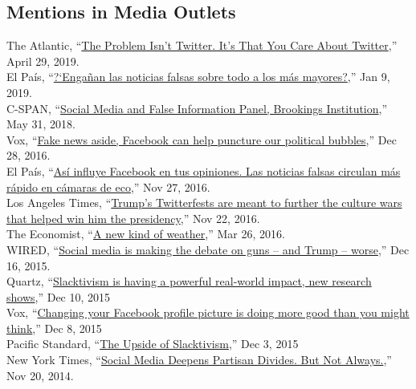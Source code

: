 \documentclass[margin,line,11pt]{resume}
\newcommand{\nl}{\vspace{0.10in}\\}
\begin{document}
\begin{resume}
                \section{\mysidestyle Mentions in Media Outlets}
The Atlantic, ``\href{https://www.theatlantic.com/ideas/archive/2019/04/political-leaders-should-stop-caring-about-twitter/588004/}{The Problem Isn't Twitter. It's That You Care About Twitter},'' April 29, 2019.\nl
El Pa\'{i}s, ``\href{https://elpais.com/tecnologia/2019/01/09/actualidad/1547029983_955487.html}{?`Enga\~{n}an las noticias falsas sobre todo a los m\'{a}s mayores?},'' Jan 9, 2019.\nl
C-SPAN, ``\href{https://www.c-span.org/video/?446330-3/social-media-false-information-panel-2}{Social Media and False Information Panel, Brookings Institution},'' May 31, 2018.\nl                
Vox, ``\href{http://www.vox.com/the-big-idea/2016/12/28/14095452/fake-news-political-bubbles-democracy-facebook}{Fake news aside, Facebook can help puncture our political bubbles},'' Dec 28, 2016.\nl
   \newpage
El Pa\'{i}s, ``\href{http://internacional.elpais.com/internacional/2016/11/25/actualidad/1480095728_565471.html}{As\'{i} influye Facebook en tus opiniones. Las noticias falsas circulan m\'{a}s r\'{a}pido en c\'{a}maras de eco},'' Nov 27, 2016.\nl
Los Angeles Times, ``\href{http://www.latimes.com/politics/la-na-pol-trump-twitter-20161122-story.html}{Trump's Twitterfests are meant to further the culture wars that helped win him the presidency},'' Nov 22, 2016.\nl 
The Economist, ``\href{http://www.economist.com/news/special-report/21695192-social-media-now-play-key-role-collective-action-new-kind-weather}{A new kind of weather},'' Mar 26, 2016.\nl
WIRED, ``\href{http://www.wired.com/2015/12/social-media-is-making-the-debate-on-guns-and-trump-worse/}{Social media is making the debate on guns -- and Trump -- worse},'' Dec 16, 2015.\nl
Quartz, ``\href{http://qz.com/570009/slacktivism-is-having-a-powerful-real-world-impact-new-research-shows/}{Slacktivism is having a powerful real-world impact, new research shows},'' Dec 10, 2015\nl
Vox, ``\href{http://www.vox.com/2015/12/8/9873822/social-media-activism-science}{Changing your Facebook profile picture is doing more good than you might think},'' Dec 8, 2015\nl
Pacific Standard, ``\href{https://psmag.com/the-upside-of-slacktivism-2a93294941b0#.hp2xyepdf}{The Upside of Slacktivism},'' Dec 3, 2015\nl
New York Times, ``\href{http://www.nytimes.com/2014/11/21/upshot/social-media-deepens-partisan-divides-but-not-always.html?_r=0}{Social Media Deepens Partisan Divides. But Not Always.},'' Nov 20, 2014.\nl

\end{resume}
\end{document}
